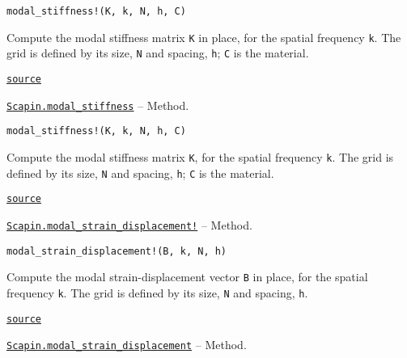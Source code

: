 \documentclass[oneside]{memoir}
\begin{document}
\begin{adjustwidth}{2em}{0pt}


\begin{verbatim}
modal_stiffness!(K, k, N, h, C)
\end{verbatim}

Compute the modal stiffness matrix \texttt{K} in place, for the spatial frequency \texttt{k}. The grid is defined by its size, \texttt{N} and spacing, \texttt{h}; \texttt{C} is the material.



\href{https://github.com/sbrisard/Scapin.jl/blob/ea3f90c60e90cdf214e41b1314a8ee608e0b8d10/src/bri17.jl#L45-L51}{\texttt{source}}


\end{adjustwidth}
\hypertarget{13564334315567723126}{} 
\hyperlink{13564334315567723126}{\texttt{Scapin.modal\_stiffness}}  -- {Method.}

\begin{adjustwidth}{2em}{0pt}


\begin{verbatim}
modal_stiffness!(K, k, N, h, C)
\end{verbatim}

Compute the modal stiffness matrix \texttt{K}, for the spatial frequency \texttt{k}. The grid is defined by its size, \texttt{N} and spacing, \texttt{h}; \texttt{C} is the material.



\href{https://github.com/sbrisard/Scapin.jl/blob/ea3f90c60e90cdf214e41b1314a8ee608e0b8d10/src/bri17.jl#L95-L101}{\texttt{source}}


\end{adjustwidth}
\hypertarget{16034034156113210739}{} 
\hyperlink{16034034156113210739}{\texttt{Scapin.modal\_strain\_displacement!}}  -- {Method.}

\begin{adjustwidth}{2em}{0pt}


\begin{verbatim}
modal_strain_displacement!(B, k, N, h)
\end{verbatim}

Compute the modal strain-displacement vector \texttt{B} in place, for the spatial frequency \texttt{k}. The grid is defined by its size, \texttt{N} and spacing, \texttt{h}.



\href{https://github.com/sbrisard/Scapin.jl/blob/ea3f90c60e90cdf214e41b1314a8ee608e0b8d10/src/bri17.jl#L1-L6}{\texttt{source}}


\end{adjustwidth}
\hypertarget{10126462544401670939}{} 
\hyperlink{10126462544401670939}{\texttt{Scapin.modal\_strain\_displacement}}  -- {Method.}
\end{document}

